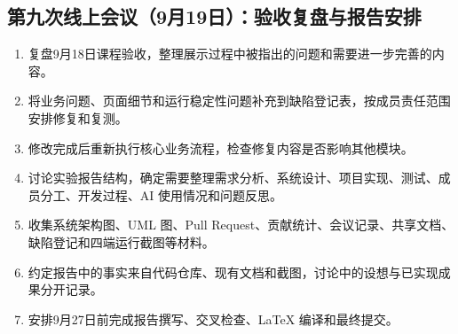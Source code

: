 \subsection{第九次线上会议（9月19日）：验收复盘与报告安排}
\begin{enumerate}
  \item 复盘9月18日课程验收，整理展示过程中被指出的问题和需要进一步完善的内容。
  \item 将业务问题、页面细节和运行稳定性问题补充到缺陷登记表，按成员责任范围安排修复和复测。
  \item 修改完成后重新执行核心业务流程，检查修复内容是否影响其他模块。
  \item 讨论实验报告结构，确定需要整理需求分析、系统设计、项目实现、测试、成员分工、开发过程、AI 使用情况和问题反思。
  \item 收集系统架构图、UML 图、Pull Request、贡献统计、会议记录、共享文档、缺陷登记和四端运行截图等材料。
  \item 约定报告中的事实来自代码仓库、现有文档和截图，讨论中的设想与已实现成果分开记录。
  \item 安排9月27日前完成报告撰写、交叉检查、LaTeX 编译和最终提交。
\end{enumerate}
